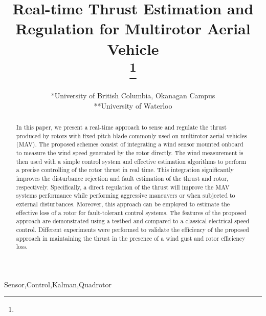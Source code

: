 \documentclass[conference]{IEEEtran}
\begin{document}
\title{Real-time Thrust Estimation and Regulation for Multirotor Aerial Vehicle\\
{}
\thanks{}
}

\author{
\and
{}
\and
{}
\and
{}
\and
*University of British Columbia, Okanagan Campus\\
**University of Waterloo
}

\maketitle

\begin{abstract}
In this paper, we present a real-time approach to sense and regulate the thrust produced by rotors with fixed-pitch blade commonly used on multirotor aerial vehicles (MAV). The proposed schemes consist of integrating a wind sensor mounted onboard to measure the wind speed generated by the rotor directly. The wind measurement is then used with a simple control system and effective estimation algorithms to perform a precise controlling of the rotor thrust in real time. This integration significantly improves the disturbance rejection and fault estimation of the thrust and rotor, respectively. Specifically, a direct regulation of the thrust will improve the MAV systems performance while performing aggressive maneuvers or when subjected to external disturbances. Moreover, this approach can be employed to estimate the effective loss of a rotor for fault-tolerant control systems. The features of the proposed approach are demonstrated using a testbed and compared to a classical electrical speed control. Different experiments were performed to validate the efficiency of the proposed approach in maintaining the thrust in the presence of a wind gust and rotor efficiency loss.
\end{abstract}

\begin{IEEEkeywords}
Sensor,Control,Kalman,Quadrotor
\end{IEEEkeywords}
\end{document}
